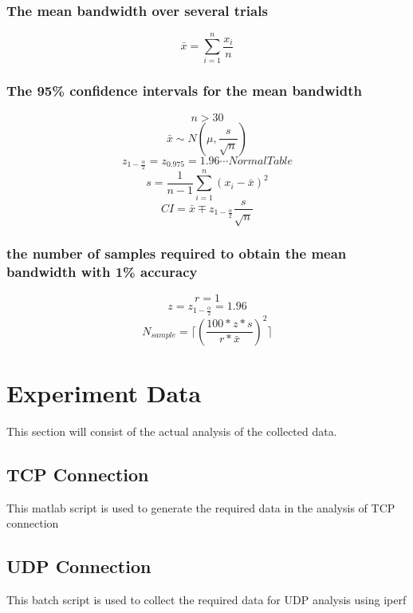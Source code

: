 \documentclass[aps,letterpaper,10pt]{revtex4}
\begin{document}
    \subsubsection{The mean bandwidth over several trials}
            \[
            \bar{x} = \sum_{i=1}^n{\frac{x_{i}}{n}}
            \]
        \subsubsection{The 95\% confidence intervals for the mean bandwidth}
            \[
            n > 30
            \]
            \[
            \bar{x} \sim N(\mu , \frac{s}{\sqrt{n}})
            \]
            \[
            z_{1-\frac{\alpha}{2}} = z_{0.975} = 1.96 \cdots Normal Table
            \]
            \[
            s = \frac{1}{n-1}\sum_{i=1}^n{(x_{i} - \bar{x})^2}
            \]
            \[
            CI = \bar{x} \mp z_{1-\frac{\alpha}{2}}\frac{s}{\sqrt{n}}
            \]
        \subsubsection{the number of samples required to obtain the mean bandwidth with 1\% accuracy}
            \[
            r = 1
            \]
            \[
            z = z_{1-\frac{\alpha}{2}} = 1.96
            \]
            \[
            N_{sample} = \lceil (\frac{100*z*s}{r*\bar{x}})^2 \rceil
            \]

\newpage
\section{Experiment Data}
This section will consist of the actual analysis of the collected data.  \vspace{5mm}
    \subsection{TCP Connection}
    This matlab script is used to generate the required data in the analysis of TCP connection    
    	
    	\vspace{3mm}
        \newpage
    \subsection{UDP Connection}
    This batch script is used to collect the required data for UDP analysis using iperf
        
    	\vspace{3mm}

                
                

\end{document}
